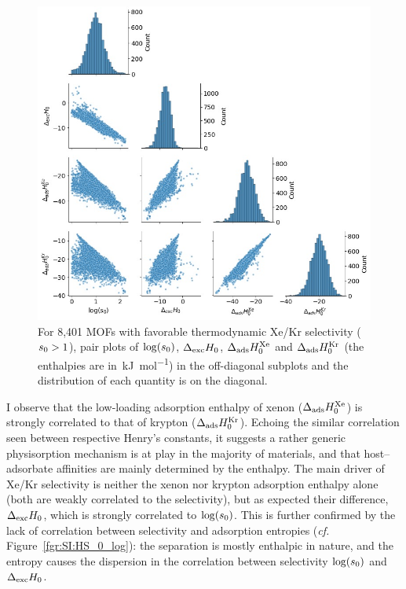 \documentclass[main.tex]{subfiles}
\begin{document}
\begin{figure}[t]
\centering
  \includegraphics[width=0.7\linewidth]{figures/2-thermo/Enthalpy_0_log.jpg}
  \caption{For 8,401 MOFs with favorable thermodynamic Xe/Kr selectivity ($s_{\text{0}} > 1$), pair plots of $\log(s_{\text{0}})$, $\Delta_{\text{exc}}H_{\text{0}}$, $\Delta_{\text{ads}}H^{\text{Xe}}_{\text{0}}$ and $\Delta_{\text{ads}}H^{\text{Kr}}_{\text{0}}$ (the enthalpies are in~\si{\kilo\joule\per\mol}) in the off-diagonal subplots and the distribution of each quantity is on the diagonal.}\label{fgr:histo_H}
\end{figure}

I observe that the low-loading adsorption enthalpy of xenon ($\Delta_{\text{ads}}H^{\text{Xe}}_{\text{0}}$) is strongly correlated to that of krypton ($\Delta_{\text{ads}}H^{\text{Kr}}_{\text{0}}$). Echoing the similar correlation seen between respective Henry's constants, it suggests a rather generic physisorption mechanism is at play in the majority of materials, and that host--adsorbate affinities are mainly determined by the enthalpy. The main driver of Xe/Kr selectivity is neither the xenon nor krypton adsorption enthalpy alone (both are weakly correlated to the selectivity), but as expected their difference, $\Delta_{\text{exc}}H_{\text{0}}$, which is strongly correlated to $\log(s_{\text{0}})$. This is further confirmed by the lack of correlation between selectivity and adsorption entropies (\emph{cf.} Figure~\ref{fgr:SI:HS_0_log}): the separation is mostly enthalpic in nature, and the entropy causes the dispersion in the correlation between selectivity $\log(s_{\text{0}})$ and $\Delta_{\text{exc}}H_{\text{0}}$.
\end{document}

